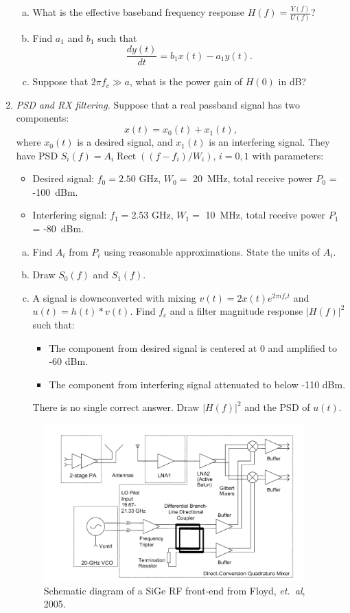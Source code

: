 \documentclass[11pt]{article}
\def\Rect{\mathop{Rect}}
\begin{document}
\begin{enumerate}
\begin{enumerate}[(a)]
\item What is the effective baseband frequency response $H(f) = \frac{Y(f)}{U(f)}$?

\item Find $a_1$ and $b_1$ such that
\[
    \frac{dy(t)}{dt} = b_1 x(t)- a_1y(t).
\]

\item Suppose that $2\pi f_c \gg a$, what is the power gain of $H(0)$ in dB?
\end{enumerate}

\item \emph{PSD and RX filtering.}
Suppose that a real passband signal has two components:
\[
    x(t)=x_0(t)+x_1(t),
\]
where $x_0(t)$ is a desired signal, and $x_1(t)$ is an interfering signal.  They have PSD
$S_i(f)=A_i\Rect((f-f_i)/W_i)$, $i=0,1$ with parameters:
\begin{itemize}
\item Desired signal: $f_0 = 2.50$ GHz, $W_0 = $ 20~MHz, total receive power $P_0$ = -100~dBm.
\item Interfering signal: $f_1 = 2.53$ GHz, $W_1 = $ 10~MHz, total receive power $P_1$ = -80~dBm.
\end{itemize}
\begin{enumerate}[(a)]
\item Find $A_i$ from $P_i$ using reasonable approximations.  State the units of $A_i$.
\item Draw $S_0(f)$ and $S_1(f)$.
\item A signal is downconverted with mixing $v(t)=2x(t)e^{2\pi i f_ct}$ and $u(t)=h(t)*v(t)$.
Find $f_c$ and a filter magnitude response $|H(f)|^2$ such that:
\begin{itemize}
\item The component from desired signal is centered at 0 and amplified to -60 dBm.
\item The component from interfering signal attenuated to below -110 dBm.
\end{itemize}
There is no single correct answer.  Draw $|H(f)|^2$ and the PSD of $u(t)$.
\end{enumerate}


\begin{figure}
  \centering
  \includegraphics[width=10cm]{transceiver_60GHz}
  \caption{Schematic diagram of a SiGe RF front-end from Floyd, \emph{et.~al}, 2005. }\label{fig:transceiver60}
\end{figure}



\end{enumerate}
\end{document}
